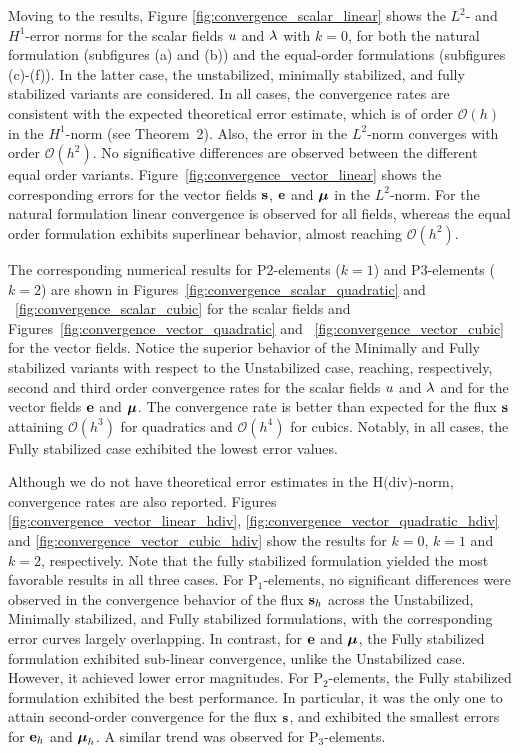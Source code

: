 Moving to the results, Figure \ref{fig:convergence_scalar_linear} shows the $L^{2}$- and $H^{1}$-error norms for the scalar fields $u$ and $\lambda$ with $k=0$, for both the natural formulation (subfigures (a) and (b)) and the equal-order formulations (subfigures (c)-(f)). In the latter case, the unstabilized, minimally stabilized, and fully stabilized variants are considered. In all cases, the convergence rates are consistent with the expected theoretical error estimate, which is of order $\mathcal{O}(h)$ in the $H^{1}$-norm (see Theorem~2). Also, the error in the $ L^{2} $-norm converges with order $ \mathcal{O}(h^2) $.
No significative differences are observed between the different equal order variants.
Figure~\ref{fig:convergence_vector_linear} shows the corresponding errors for the vector fields
$\mathbf{s}$, $\mathbf{e}$ and $\boldsymbol{\mu}$ in the $ L^{2} $-norm. For the natural formulation linear convergence is observed for all fields, whereas the equal order formulation exhibits superlinear behavior, almost reaching $ \mathcal{O}(h^2) $. 

The corresponding numerical results for $\text{P}2$-elements ($k=1$) and $\text{P}3$-elements ($k=2$) are shown in Figures~\ref{fig:convergence_scalar_quadratic} and ~\ref{fig:convergence_scalar_cubic}
for the scalar fields and Figures~\ref{fig:convergence_vector_quadratic} and ~\ref{fig:convergence_vector_cubic}
for the vector fields. Notice the superior behavior of the Minimally and Fully stabilized 
variants with respect to the Unstabilized case, reaching, respectively, second and third order convergence rates for the scalar fields $u$ and $\lambda$ and for the vector
fields $\mathbf{e}$ and $\boldsymbol{\mu}$. The convergence rate is better than expected
for the flux $\mathbf{s}$ attaining $ \mathcal{O}(h^3) $ for quadratics and $ \mathcal{O}(h^4) $ 
for cubics. Notably, in all cases, the Fully stabilized case exhibited the lowest error values.

Although we do not have theoretical error estimates in the $ \text{H(div)} $-norm, 
convergence rates are also reported. Figures \ref{fig:convergence_vector_linear_hdiv}, 
\ref{fig:convergence_vector_quadratic_hdiv} and \ref{fig:convergence_vector_cubic_hdiv}
show the results for $k=0$, $k=1$ and $k=2$, respectively.
Note that the fully stabilized formulation yielded the most favorable results in all three cases. For $ \text{P}_1 $-elements, no significant differences were observed in the convergence behavior of the flux $ \mathbf{s}_{h} $ across the Unstabilized, Minimally stabilized, and Fully stabilized formulations, with the corresponding error curves largely overlapping. In contrast, for $ \mathbf{e} $ and $ \boldsymbol{\mu} $, the Fully stabilized formulation exhibited sub-linear convergence, unlike the Unstabilized case. However, it achieved lower error magnitudes. For $ \text{P}_2 $-elements, the Fully stabilized formulation exhibited the best performance. In particular, it was the only one to attain second-order convergence for the flux $ \mathbf{s} $, and exhibited the smallest errors for $ \mathbf{e}_{h} $ and $ \boldsymbol{\mu}_{h} $. A similar trend was observed for $ \text{P}_3 $-elements. 

